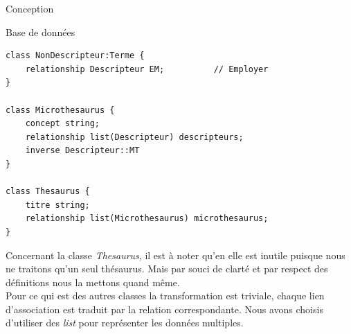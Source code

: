 \documentclass[a4paper, 12pt]{report}
\begin{document}
\begin{chapter}{Conception}
\begin{section}{Base de données}
\begin{verbatim}
class NonDescripteur:Terme {
	relationship Descripteur EM;          // Employer
}

class Microthesaurus {
	concept string;
	relationship list(Descripteur) descripteurs;
	inverse Descripteur::MT
}

class Thesaurus {
	titre string;
	relationship list(Microthesaurus) microthesaurus;
}
	\end{verbatim}

	Concernant la classe \emph{Thesaurus}, il est à noter qu'en elle est
	inutile puisque nous ne traitons qu'un seul thésaurus. Mais par souci de clarté et par respect des définitions nous la mettons quand même.\\


	Pour ce qui est des autres classes la transformation est triviale, chaque lien d'association est traduit par la relation correspondante. Nous avons choisis d'utiliser des \emph{list} pour représenter les données multiples.
	\end{section}
\end{chapter}
\end{document}
